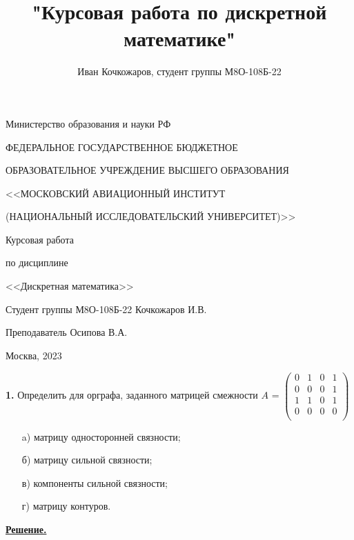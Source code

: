 \documentclass[12pt, letterpaper, titlepage]{article}
\title{"Курсовая работа по дискретной математике"}
\author{Иван Кочкожаров, студент группы М8О-108Б-22}
\begin{document}
\begin{titlepage}

    \thispagestyle{empty}
    
    \centerline{Министерство образования и науки РФ}
    \centerline{ФЕДЕРАЛЬНОЕ ГОСУДАРСТВЕННОЕ БЮДЖЕТНОЕ}
    \centerline{ОБРАЗОВАТЕЛЬНОЕ
    УЧРЕЖДЕНИЕ ВЫСШЕГО ОБРАЗОВАНИЯ}
    \centerline{<<МОСКОВСКИЙ АВИАЦИОННЫЙ ИНСТИТУТ}
    \centerline{(НАЦИОНАЛЬНЫЙ ИССЛЕДОВАТЕЛЬСКИЙ УНИВЕРСИТЕТ)>>}
    
    \vfill
    
    \centerline{\Huge{Курсовая работа}}
    \centerline{\large{по дисциплине}}
    \centerline{\Huge{<<Дискретная математика>>}}
    
    \vfill
    
    Студент группы М8О-108Б-22 \hfill Кочкожаров И.В.
    
    Преподаватель \hfill Осипова В.А.
    
    \vfill
    
    \centerline{Москва, 2023}
    \clearpage
\end{titlepage}
\setcounter{page}{2}
\textbf{1.} Определить для орграфа, заданного матрицей смежности $A$ =
$
    \begin{pmatrix}
        0 & 1 & 0 & 1 \\
        0 & 0 & 0 & 1 \\
        1 & 1 & 0 & 1 \\
        0 & 0 & 0 & 0 \\
    \end{pmatrix}
$
\begin{itemize}
    \item[a)] матрицу односторонней связности;
    \item[б)] матрицу сильной связности;
    \item[в)] компоненты сильной связности;
    \item[г)] матрицу контуров.
\end{itemize}
\underline{\textbf{Решение.}}
\end{document}
